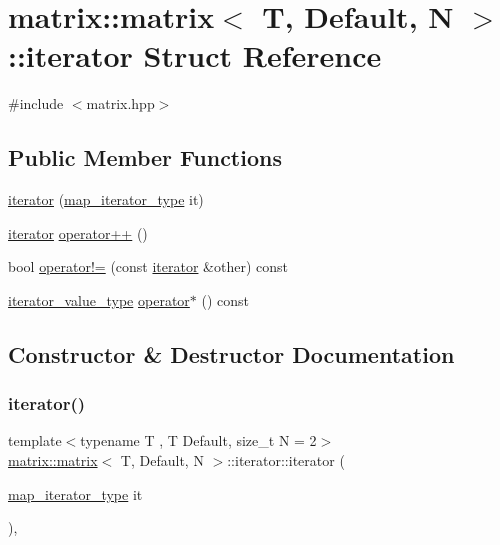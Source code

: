 \hypertarget{structmatrix_1_1matrix_1_1iterator}{}\section{matrix\+:\+:matrix$<$ T, Default, N $>$\+:\+:iterator Struct Reference}
\label{structmatrix_1_1matrix_1_1iterator}


{\ttfamily \#include $<$matrix.\+hpp$>$}

\subsection*{Public Member Functions}
\begin{DoxyCompactItemize}
\item 
\hyperlink{structmatrix_1_1matrix_1_1iterator_aa1102901eb3cdcec6ff1322dc1701b93}{iterator} (\hyperlink{structmatrix_1_1matrix_a718c745a811e13b64ba21239288666a6}{map\+\_\+iterator\+\_\+type} it)
\item 
\hyperlink{structmatrix_1_1matrix_1_1iterator}{iterator} \hyperlink{structmatrix_1_1matrix_1_1iterator_af3a7da3dc2ebe100f800001706eca436}{operator++} ()
\item 
bool \hyperlink{structmatrix_1_1matrix_1_1iterator_a4f8dfb7ac8e333ef7cd3e2d2de18c365}{operator!=} (const \hyperlink{structmatrix_1_1matrix_1_1iterator}{iterator} \&other) const
\item 
\hyperlink{structmatrix_1_1matrix_a1de5c69f5d9e3b6d3e54b1e4cb433d65}{iterator\+\_\+value\+\_\+type} \hyperlink{structmatrix_1_1matrix_1_1iterator_a6f170a1d6e7272725ab70fda22c8d8b6}{operator$\ast$} () const
\end{DoxyCompactItemize}


\subsection{Constructor \& Destructor Documentation}
\mbox{\label{structmatrix_1_1matrix_1_1iterator_aa1102901eb3cdcec6ff1322dc1701b93}} 
\subsubsection{\texorpdfstring{iterator()}{iterator()}}
{\footnotesize\ttfamily template$<$typename T , T Default, size\+\_\+t N = 2$>$ \\
\hyperlink{structmatrix_1_1matrix}{matrix\+::matrix}$<$ T, Default, N $>$\+::iterator\+::iterator (\begin{DoxyParamCaption}\item[{\hyperlink{structmatrix_1_1matrix_a718c745a811e13b64ba21239288666a6}{map\+\_\+iterator\+\_\+type}}]{it }\end{DoxyParamCaption})\hspace{0.3cm}{\ttfamily [inline]}, {\ttfamily [explicit]}}



